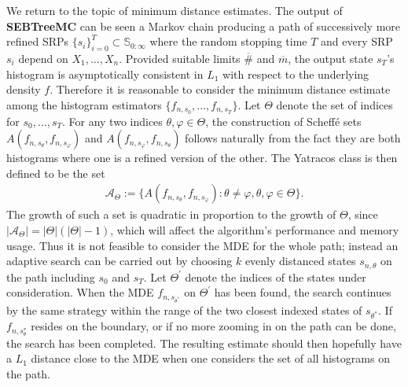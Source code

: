 \documentclass{report}
\begin{document}
We return to the topic of minimum distance estimates. The output of \textbf{SEBTreeMC} can be seen a Markov chain producing a path of successively more
refined SRPs $\{s_{i}\}_{i=0}^T \subset \mathbb{S}_{0:\infty}$ where the random stopping time $T$ and every SRP $s_i$ depend on $X_1,\dots,X_n$. 
Provided suitable limits $\overline{\#}$ and $\overline{m}$, the output state $s_{T}$'s histogram is
asymptotically consistent in $L_1$ with respect to the underlying density $f$. Therefore it is reasonable to consider the minimum distance estimate among the histogram estimators 
$\{f_{n,s_0}, \dots, f_{n,s_T}\}$. Let $\Theta$ denote the set of indices for $s_0,\dots,s_{T}$. For any two indices $\theta, \varphi \in \Theta$, 
the construction of Scheffé sets $A(f_{n,s_\theta},f_{n,s_\varphi})$ and $A(f_{n,s_\varphi}, f_{n,s_\theta})$ 
follows naturally from the fact they are both histograms where one is a refined version of the other. The Yatracos
class is then defined to be the set 
\begin{align*}
	\mathcal{A}_\Theta := \{ A(f_{n,s_\theta},f_{n,s_\varphi}) : \theta \neq \varphi, \theta, \varphi \in \Theta\}.
\end{align*}
The growth of such a set is quadratic in proportion to the growth of $\Theta$, since $|\mathcal{A}_\Theta| = |\Theta|(|\Theta| - 1)$, which will affect the algorithm's performance and memory usage.
Thus it is not feasible to consider the MDE for the whole path; instead an adaptive search can be 
carried out by choosing $k$ evenly distanced states $s_{n, \theta}$ on the path including $s_0$ and $s_T$. Let $\Theta^\prime$ denote the indices of the states under consideration.
When the MDE $f_{n,s_{\theta^*}}$ on $\Theta^\prime$ has been found, the search continues by the same strategy within the range of the two closest indexed states 
of $s_{\theta^*}$. If $f_{n,{s_\theta^*}}$ resides on the boundary, or if no more zooming in on the path can be done, the search has been completed.
The resulting estimate should then hopefully have a $L_1$ distance close to the MDE when one considers
the set of all histograms on the path.
\end{document}
